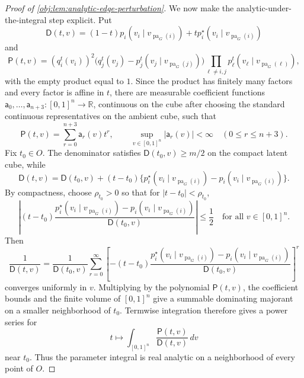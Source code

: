 \begin{proof}[Proof of \cref{obj:lem:analytic-edge-perturbation}]
We now make the analytic-under-the-integral step explicit.  Put
\[
\mathsf D(t,v)=(1-t)p_i(v_i\mid v_{\operatorname{pa}_G(i)})
+t p_i^\star(v_i\mid v_{\operatorname{pa}_G(i)})
\]
and
\[
\mathsf P(t,v)
=(q_i^t(v_i))^2\bigl(q_j^t(v_j)-p_j^t(v_j\mid v_{\operatorname{pa}_G(j)})\bigr)
\prod_{\ell\ne i,j}p_\ell^t(v_\ell\mid v_{\operatorname{pa}_G(\ell)}),
\]
with the empty product equal to \(1\).  Since the product has finitely many factors and every factor is affine in \(t\), there are measurable coefficient functions \(\mathsf a_0,\ldots,\mathsf a_{n+3}:[0,1]^n\to\mathbb R\), continuous on the cube after choosing the standard continuous representatives on the ambient cube, such that
\[
\mathsf P(t,v)=\sum_{r=0}^{n+3}\mathsf a_r(v)t^r,
\qquad
\sup_{v\in[0,1]^n}|\mathsf a_r(v)|<\infty
\quad(0\le r\le n+3).
\]
Fix \(t_0\in O\).  The denominator satisfies \(\mathsf D(t_0,v)\ge m/2\) on the compact latent cube, while
\[
\mathsf D(t,v)=\mathsf D(t_0,v)+(t-t_0)
\{p_i^\star(v_i\mid v_{\operatorname{pa}_G(i)})-p_i(v_i\mid v_{\operatorname{pa}_G(i)})\}.
\]
By compactness, choose \(\rho_{t_0}>0\) so that for \(|t-t_0|<\rho_{t_0}\),
\[
\left|
(t-t_0)\frac{p_i^\star(v_i\mid v_{\operatorname{pa}_G(i)})
-p_i(v_i\mid v_{\operatorname{pa}_G(i)})}{\mathsf D(t_0,v)}
\right|\le \frac12
\quad\text{for all }v\in[0,1]^n.
\]
Then
\[
\frac1{\mathsf D(t,v)}
=\frac1{\mathsf D(t_0,v)}
\sum_{r=0}^\infty
\left[-(t-t_0)\frac{p_i^\star(v_i\mid v_{\operatorname{pa}_G(i)})
-p_i(v_i\mid v_{\operatorname{pa}_G(i)})}{\mathsf D(t_0,v)}\right]^r
\]
converges uniformly in \(v\).  Multiplying by the polynomial \(\mathsf P(t,v)\), the coefficient bounds and the finite volume of \([0,1]^n\) give a summable dominating majorant on a smaller neighborhood of \(t_0\).  Termwise integration therefore gives a power series for
\[
t\longmapsto \int_{[0,1]^n}\frac{\mathsf P(t,v)}{\mathsf D(t,v)}\,dv
\]
near \(t_0\).  Thus the parameter integral is real analytic on a neighborhood of every point of \(O\). %


\end{proof}
